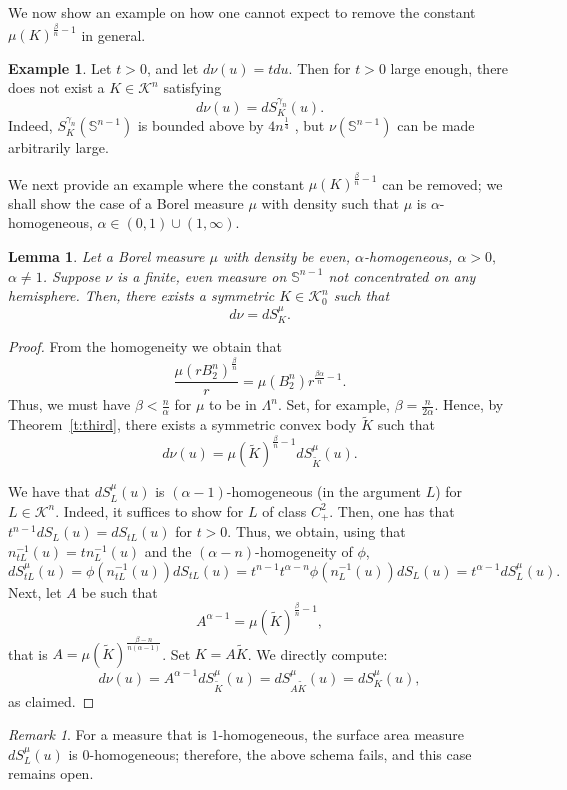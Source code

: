 \documentclass[11pt]{amsart}
\newtheorem{lemma}[theorem]{Lemma}
\theoremstyle{definition}
\newtheorem{example}[theorem]{Example}
\theoremstyle{remark}
\newtheorem{remark}[theorem]{Remark}
\numberwithin{equation}{section}
\newcommand{\s}{\mathbb{S}}
\newcommand{\conbod}{\mathcal{K}^n}
\begin{document}
\noindent We now show an example on how one cannot expect to remove the constant $\mu(K)^{\frac{\beta}{n}-1}$ in general.
\begin{example}
Let $t>0$, and let $d\nu(u)=tdu.$ Then for $t>0$ large enough, there does not exist a $K\in\conbod$ satisfying $$d\nu(u)=dS^{\gamma_n}_{K}(u).$$ Indeed, $S^{\gamma_n}_{K}(\s^{n-1})$ is bounded above by $4n^{\frac{1}{4}}$ \cite{Ball93, Naz03}, but $\nu(\s^{n-1})$ can be made arbitrarily large.
\end{example}

We next provide an example where the constant $\mu(K)^{\frac{\beta}{n}-1}$ can be removed; we shall show the case of a Borel measure $\mu$ with density such that $\mu$ is $\alpha$-homogeneous, $\alpha\in(0,1)\cup(1,\infty)$.
\begin{lemma}
\label{l:almost_hom}
Let a Borel measure $\mu$ with density be even, $\alpha$-homogeneous, $\alpha > 0,$ $\alpha\neq 1$. Suppose $\nu$ is a finite, even measure on $\s^{n-1}$ not concentrated on any hemisphere. Then, there exists a symmetric $K\in\conbod_0$ such that
$$d\nu=dS^{\mu}_{K}.$$
\end{lemma}
\begin{proof}
From the homogeneity we obtain that
$$\frac{\mu(rB_2^n)^\frac{\beta}{n}}{r}=\mu(B_2^n)r^{\frac{\beta\alpha}{n}-1}.$$
Thus, we must have $\beta < \frac{n}{\alpha}$ for $\mu$ to be in $\Lambda^n$. Set, for example, $\beta=\frac{n}{2\alpha}.$ Hence, by Theorem~\ref{t:third}, there exists a symmetric convex body $\tilde{K}$ such that
$$d\nu(u)=\mu(\tilde{K})^{\frac{\beta}{n}-1}dS^{\mu}_{\tilde{K}}(u).$$

We have that $dS^{\mu}_{L}(u)$ is $(\alpha-1)$-homogeneous (in the argument $L$) for $L\in\conbod$. Indeed, it suffices to show for $L$ of class $C^2_+$. Then, one has that $t^{n-1}dS_L(u)=dS_{tL}(u)$ for $t>0$.  Thus, we obtain, using that $n^{-1}_{tL}(u)=tn^{-1}_{L}(u)$ and the $(\alpha-n)$-homogeneity of $\phi$,
$$dS^{\mu}_{tL}(u)=\phi\left(n^{-1}_{tL}(u)\right)dS_{tL}(u)=t^{n-1}t^{\alpha-n}\phi\left(n^{-1}_{L}(u)\right)dS_{L}(u)=t^{\alpha-1}dS^{\mu}_{L}(u).$$
Next, let $A$ be such that
$$A^{\alpha-1}=\mu(\tilde{K})^{\frac{\beta}{n}-1},$$
that is $A=\mu(\tilde{K})^{\frac{\beta-n}{n(\alpha-1)}}$. Set $K=A\tilde{K}$. We directly compute:
$$d\nu(u)=A^{\alpha-1}dS^{\mu}_{\tilde{K}}(u)=dS^{\mu}_{A\tilde{K}}(u)=dS^{\mu}_{K}(u),$$
as claimed. 
\end{proof}

\begin{remark}
For a measure that is $1$-homogeneous, the surface area measure $dS^{\mu}_{L}(u)$ is $0$-homogeneous; therefore, the above schema fails, and this case remains open.
\end{remark}
\end{document}

